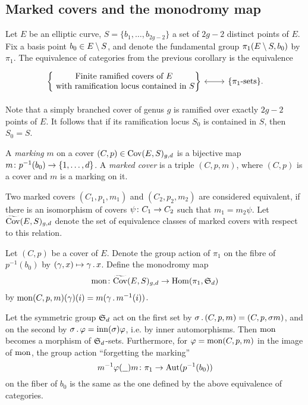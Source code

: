 \subsection{Marked covers and the monodromy map}

Let $E$ be an elliptic curve, $S=\{b_1,\dotsc,b_{2g-2}\}$ a set of $2g-2$ distinct points of $E$. Fix a basis point $b_0\in E\setminus S$, and denote the fundamental group $\pi_1(E\setminus S, b_0)$ by $\pi_1$.
The equivalence of categories from the previous corollary is the equivalence
\[
 \begin{tikzcd}
  \begin{Bmatrix}\text{Finite ramified covers of }E\\\text{ with ramification locus contained in $S$}\end{Bmatrix} \arrow[<->]{r} & \{\pi_1\text{-sets}\}.
 \end{tikzcd}
\]

Note that a simply branched cover of genus $g$ is ramified over exactly $2g-2$ points of $E$. It follows that if its ramification locus $S_0$ is contained in $S$, then $S_0 = S$.

\begin{defi}
 A \emph{marking} $m$ on a cover $(C,p)\in \operatorname{Cov}(E,S)_{g,d}$ is a bijective map $m\colon p^{-1}(b_0)\to \{1,\dotsc,d\}$. A \emph{marked cover} is a triple $(C,p,m)$, where $(C,p)$ is a cover and $m$ is a marking on it.
 
 Two marked covers $(C_1,p_1,m_1)$ and $(C_2,p_2,m_2)$ are considered equivalent, if there is an isomorphism of covers $\psi\colon C_1 \to C_2$ such that $m_1=m_2\psi$. Let $\widetilde{\operatorname{Cov}}(E,S)_{g,d}$ denote the set of equivalence classes of marked covers with respect to this relation.
\end{defi}

\begin{defi}
 Let $(C,p)$ be a cover of $E$. Denote the group action of $\pi_1$ on the fibre of $p^{-1}(b_0)$ by $(\gamma,x)\mapsto \gamma\,.\, x$. Define the monodromy map \[\operatorname{mon}\colon \widetilde{\operatorname{Cov}}(E,S)_{g,d} \to \operatorname{Hom}(\pi_1, \operatorname{\mathfrak{S}}_d)\]
 by $\operatorname{mon}(C,p,m)(\gamma)(i)=m(\gamma\,.\, m^{-1}(i))$.
\end{defi}

Let the symmetric group $\operatorname{\mathfrak{S}}_d$ act on the first set by $\sigma \,.\, (C,p,m)=(C,p,\sigma m)$, and on the second by $\sigma \,.\, \varphi = \operatorname{inn}(\sigma) \varphi$, i.e. by inner automorphisms. Then $\operatorname{mon}$ becomes a morphism of $\operatorname{\mathfrak{S}}_d$-sets.
Furthermore, for $\varphi=\operatorname{mon}(C,p,m)$ in the image of $\operatorname{mon}$, the group action ``forgetting the marking'' \[m^{-1}\varphi(\underline{\ \ })m\cl\pi_1\to \Aut(p^{-1}(b_0))\] on the fiber of $b_0$ is the same as the one defined by the above equivalence of categories.


